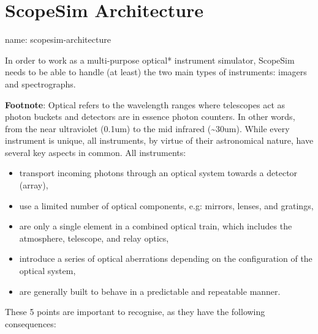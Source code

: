 

\section{ScopeSim Architecture%
  \label{scopesim-architecture}%
}

\begin{DUfieldlist}
\item[{name:}]
scopesim-architecture
\end{DUfieldlist}

In order to work as a multi-purpose optical* instrument simulator, ScopeSim needs to be able to handle (at least) the two main types of instruments: imagers and spectrographs.

\textbf{Footnote}: Optical refers to the wavelength ranges where telescopes act as \textquotedbl{}photon buckets\textquotedbl{} and detectors are in essence \textquotedbl{}photon counters\textquotedbl{}.
In other words, from the near ultraviolet (0.1um) to the mid infrared (\textasciitilde{}30um).
While every instrument is unique, all instruments, by virtue of their astronomical nature, have several key aspects in common.
All instruments:

\begin{itemize}
\item transport incoming photons through an optical system towards a detector (array),

\item use a limited number of optical components, e.g: mirrors, lenses, and gratings,

\item are only a single element in a combined optical train, which includes the atmosphere, telescope, and relay optics,

\item introduce a series of optical aberrations depending on the configuration of the optical system,

\item are generally built to behave in a predictable and repeatable manner.
\end{itemize}

These 5 points are important to recognise, as they have the following consequences:

